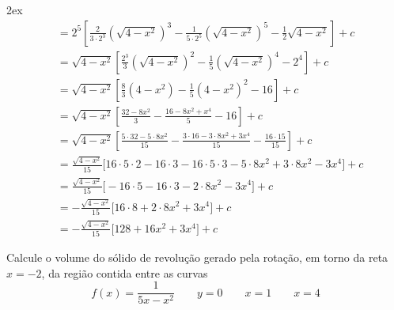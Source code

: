 \documentclass[a4paper,12pt,fleqn]{article}
\begin{document}
\begin{answer}
\begin{spreadlines}{2ex}
\begin{align*}
      & = 2^5\left[
      \frac{2}{3\cdot 2^3}\left(\sqrt{4-x^2}\right)^3
      - \frac{1}{5\cdot 2^5}\left(\sqrt{4-x^2}\right)^5
      - \frac{1}{2} \sqrt{4-x^2}
      \right] + c \\
      & = \sqrt{4-x^2}
      \left[
      \frac{2^3}{3}\left(\sqrt{4-x^2}\right)^2
      - \frac{1}  {5}\left(\sqrt{4-x^2}\right)^4
      - 2^4
      \right] + c \\
      & = \sqrt{4-x^2}
      \left[
      \frac{8}{3}\left(4-x^2\right)
      - \frac{1}{5}\left(4-x^2\right)^2
      - 16
      \right] + c \\
      & = \sqrt{4-x^2}
      \left[
      \frac{32-8x^2}{3}
      - \frac{16-8x^2+x^4}{5}
      - 16
      \right] + c \\
      & = \sqrt{4-x^2}
      \left[
      \frac{5\cdot 32 - 5\cdot 8x^2}{15}
      -\frac{3\cdot 16 - 3\cdot 8x^2 + 3x^4}{15} - \frac{16\cdot 15}{15}
      \right] + c \\
      & = \frac{\sqrt{4-x^2}}{15}
      \Big[
      16\cdot 5\cdot 2 - 16 \cdot 3 - 16\cdot 5 \cdot 3
      - 5\cdot 8x^2 + 3\cdot 8x^2
      - 3x^4
      \Big] + c \\
      & = \frac{\sqrt{4-x^2}}{15}
      \Big[
      - 16\cdot 5 -16 \cdot 3
      - 2\cdot 8x^2
      - 3x^4
      \Big] + c \\
      & = -\frac{\sqrt{4-x^2}}{15}
      \Big[
      16\cdot 8
      + 2\cdot 8x^2
      + 3x^4
      \Big] + c \\
      & = -\frac{\sqrt{4-x^2}}{15}
      \Big[ 128 + 16x^2 + 3x^4 \Big] + c
    \end{align*}
  \end{spreadlines}
\end{answer}

Calcule o volume do sólido de revolução gerado pela rotação,
em torno da reta \(x=-2\), da região contida entre as curvas
\[
  f(x) = \frac{1}{5x-x^2} \qquad
  y = 0 \qquad
  x = 1 \qquad
  x = 4
\]
\end{document}
